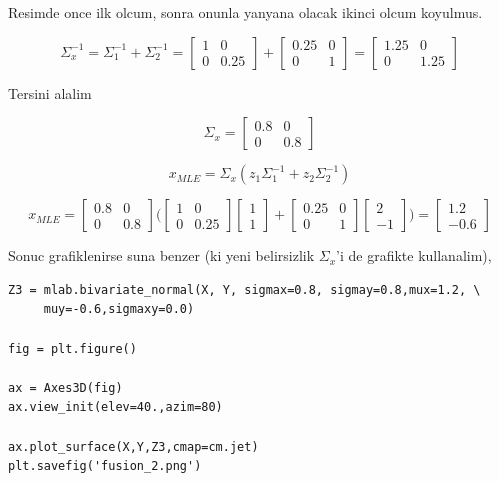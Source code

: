 \documentclass[12pt,fleqn]{article}\usepackage{../common}
\begin{document}
Resimde once ilk olcum, sonra onunla yanyana olacak ikinci olcum koyulmus. 

$$ \Sigma_x^{-1} = \Sigma_1^{-1} + \Sigma_2^{-1}  =
\left[\begin{array}{cc}
1 & 0 \\ 0 & 0.25
\end{array}\right] + 
\left[\begin{array}{cc}
0.25 & 0 \\ 0 & 1
\end{array}\right] =
\left[\begin{array}{cc}
1.25 & 0 \\ 0 & 1.25
\end{array}\right] 
$$

Tersini alalim 

$$ \Sigma_x =
\left[\begin{array}{cc}
0.8 & 0 \\ 0 & 0.8
\end{array}\right] 
$$

$$ x_{MLE} =  \Sigma_x (z_1\Sigma_1^{-1}  + z_2\Sigma_2^{-1}) $$

$$ 
x_{MLE} =
\left[\begin{array}{cc}
0.8 & 0 \\ 0 & 0.8
\end{array}\right] 
\bigg(
\left[\begin{array}{cc}
1 & 0 \\ 0 & 0.25
\end{array}\right] 
\left[\begin{array}{c}
1 \\ 1
\end{array}\right]  + 
\left[\begin{array}{cc}
0.25 & 0 \\ 0 & 1
\end{array}\right] 
\left[\begin{array}{r}
2 \\ -1
\end{array}\right]  
\bigg) = 
\left[\begin{array}{r}
1.2 \\ -0.6
\end{array}\right]  
$$

Sonuc grafiklenirse suna benzer (ki yeni belirsizlik $\Sigma_x$'i de
grafikte kullanalim),

\begin{verbatim}
Z3 = mlab.bivariate_normal(X, Y, sigmax=0.8, sigmay=0.8,mux=1.2, \
     muy=-0.6,sigmaxy=0.0)

fig = plt.figure()

ax = Axes3D(fig)
ax.view_init(elev=40.,azim=80)

ax.plot_surface(X,Y,Z3,cmap=cm.jet)
plt.savefig('fusion_2.png')
\end{verbatim}
\end{document}

